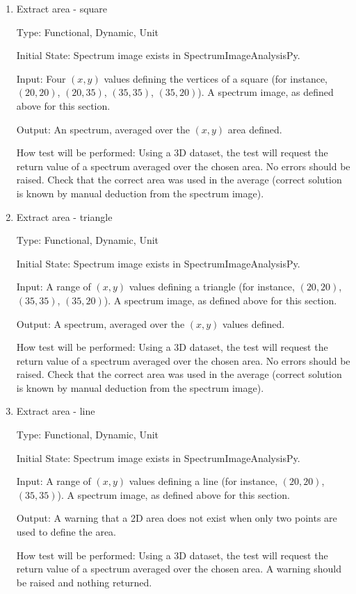 \documentclass[12pt, titlepage]{article}
\newcommand{\progname}{SpectrumImageAnalysisPy}
\begin{document}
\begin{enumerate}

\item{Extract area - square}

Type: Functional, Dynamic, Unit

Initial State: Spectrum image exists in \progname{}.

Input: Four $(x,y)$ values defining the vertices of a square (for instance,
$(20, 20)$, $(20, 35)$, $(35, 35)$, $(35, 20)$). A spectrum image, as defined
above for this section.

Output: An spectrum, averaged over the $(x,y)$ area defined.

How test will be performed: Using a 3D dataset, the test will request the return
value of a spectrum averaged over the chosen area. No errors should be raised.
Check that the correct area was used in the average (correct solution is known
by manual deduction from the spectrum image).

\item{Extract area - triangle}

Type: Functional, Dynamic, Unit

Initial State: Spectrum image exists in \progname{}.

Input: A range of $(x,y)$ values defining a triangle (for instance, $(20, 20)$,
$(35, 35)$, $(35, 20)$). A spectrum image, as defined above for this section.

Output: A spectrum, averaged over the $(x,y)$ values defined.

How test will be performed: Using a 3D dataset, the test will request the return
value of a spectrum averaged over the chosen area. No errors should be raised.
Check that the correct area was used in the average (correct solution is known
by manual deduction from the spectrum image).

\item{Extract area - line}

Type: Functional, Dynamic, Unit

Initial State: Spectrum image exists in \progname{}.

Input: A range of $(x,y)$ values defining a line (for instance, $(20, 20)$,
$(35, 35)$). A spectrum image, as defined above for this section.

Output: A warning that a 2D area does not exist when only two points are used to
define the area.

How test will be performed: Using a 3D dataset, the test will request the return
value of a spectrum averaged over the chosen area. A warning should be raised
and nothing returned.


\end{enumerate}
\end{document}
